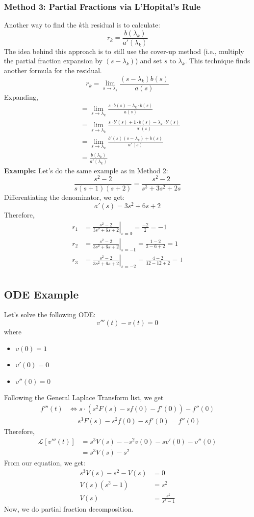 \documentclass[10pt]{article}
\newcommand{\llra}{\Longleftrightarrow}
\newcommand{\laplace}{\mathcal{L}}
\begin{document}
\subsubsection*{Method 3: Partial Fractions via L'Hopital's Rule}
Another way to find the $k$th residual is to calculate:
\[r_k = \frac{b(\lambda_k)}{a'(\lambda_k)}\]
The idea behind this approach is to still use the cover-up method (i.e., multiply the partial fraction expansion by $(s - \lambda_k)$) and set $s$ to $\lambda_k$.  This technique finds another formula for the residual.
\[r_k = \lim_{s \rightarrow \lambda_k} \frac{(s - \lambda_k)b(s)}{a(s)}\]
Expanding,
\begin{align*}
    &= \lim_{s \rightarrow \lambda_k} \frac{s \cdot b(s) - \lambda_k \cdot b(s)}{a(s)}\\
    &= \lim_{s \rightarrow \lambda_k} \frac{s \cdot b'(s) + 1 \cdot b(s) - \lambda_k \cdot b'(s)}{a'(s)}\\
    &= \lim_{s \rightarrow \lambda_k} \frac{b'(s) (s - \lambda_k) + b(s)}{a'(s)}\\
    &= \frac{b(\lambda_k)}{a'(\lambda_k)}
\end{align*}
\textbf{Example:} Let's do the same example as in Method 2:
\[\frac{s^2 - 2}{s(s + 1)(s + 2)} = \frac{s^2 - 2}{s^3 + 3s^2 + 2s}\]
Differentiating the denominator, we get:
\[a'(s) = 3s^2 + 6s + 2\]
Therefore,
\begin{align*}
    r_1 &= \left.\frac{s^2 - 2}{3s^2 + 6s + 2}\right|_{s = 0} = \frac{-2}{2} = -1\\
    r_2 &= \left.\frac{s^2 - 2}{3s^2 + 6s + 2}\right|_{s = -1} = \frac{1-2}{3-6+2} = 1\\
    r_3 &= \left.\frac{s^2 - 2}{3s^2 + 6s + 2}\right|_{s = -2} = \frac{4-2}{12-12+2} = 1\\
\end{align*}
\subsection*{ODE Example}
Let's solve the following ODE:
\[v'''(t) - v(t) = 0\]
where
\begin{itemize}
    \item $v(0) = 1$
    \item $v'(0) = 0$
    \item $v''(0) = 0$
\end{itemize}
Following the General Laplace Transform list, we get 
\begin{align*}
    f'''(t) &\llra s \cdot (s^2 F(s) - sf(0) - f'(0)) - f''(0)\\
    &= s^3 F(s) - s^2 f(0) - s f'(0) = f''(0)
\end{align*}
Therefore,
\begin{align*}
\laplace[v'''(t)] &= s^3 V(s) -- s^2 v(0) - s v'(0) - v''(0)\\
&= s^3 V(s) - s^2
\end{align*}
From our equation, we get:
\begin{align*}
    s^3 V(s) - s^2 - V(s) &= 0\\
    V(s)(s^3 - 1) &= s^2\\
    V(s) &= \frac{s^2}{s^3 - 1}
\end{align*}
Now, we do partial fraction decomposition.
\end{document}
